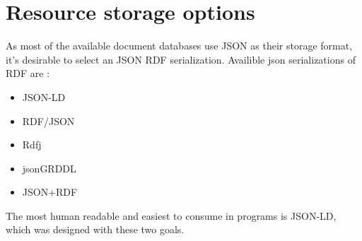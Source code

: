 
\section{Resource storage options}
As most of the available document databases use JSON as their storage format, it's desirable to select an JSON RDF serialization. Availible json serializations of RDF are \cite{onlineW3CRdfSyntax}:
\begin{itemize}
	\item JSON-LD
	\item RDF/JSON
	\item Rdfj
	\item jsonGRDDL
	\item JSON+RDF
\end{itemize}
The most human readable and easiest to consume in programs is JSON-LD, which was designed with these two goals. %

